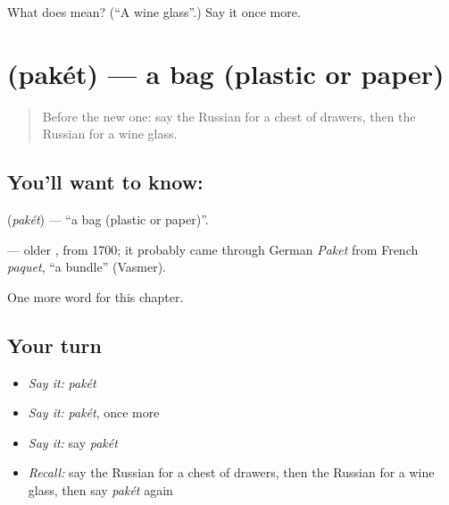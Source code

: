 \begin{tcolorbox}[breakable,colback=teal!4,colframe=teal!35!black,title={Before you move on}]
What does  mean? (\textquotedblleft{}A wine glass\textquotedblright{}.) Say it once more.
\end{tcolorbox}
\section[\texorpdfstring{\ru{пакет} (pakét)}{пакет (pakét)}]{ (pakét) — a bag (plastic or paper)}

\label{lesson:RU-C160-paket}



\begin{quote}
Before the new one: say the Russian for a chest of drawers, then the Russian for a wine glass.
\end{quote}

\subsection*{You'll want to know: }
\textbf{} (\emph{pakét}) — \textquotedblleft{}a bag (plastic or paper)\textquotedblright{}.

\begin{cousinweb}
\textbf{} — older \emph{}, from 1700; it probably came through German \emph{Paket} from French \emph{paquet}, \textquotedblleft{}a bundle\textquotedblright{} (Vasmer).
\end{cousinweb}

\begin{grammarlens}[title={What you've built}]
One more word for this chapter.
\end{grammarlens}

\subsection*{Your turn}
\begin{itemize}
\raggedright
  \item \emph{Say it:} \emph{pakét}
  \item \emph{Say it:} \emph{pakét}, once more
  \item \emph{Say it:} say \emph{pakét}
  \item \emph{Recall:} say the Russian for a chest of drawers, then the Russian for a wine glass, then say \emph{pakét} again
\end{itemize}

